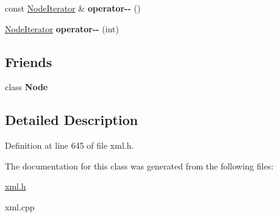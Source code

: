 \begin{DoxyCompactItemize}
\item 
\hypertarget{classphys_1_1xml_1_1NodeIterator_a9d0ace0a01c3ea0a0ff2ed389b4a5141}{
const \hyperlink{classphys_1_1xml_1_1NodeIterator}{NodeIterator} \& {\bfseries operator-\/-\/} ()}
\label{da/d4f/classphys_1_1xml_1_1NodeIterator_a9d0ace0a01c3ea0a0ff2ed389b4a5141}

\item 
\hypertarget{classphys_1_1xml_1_1NodeIterator_a4775254b1fbfc2e10a6024241be55f6a}{
\hyperlink{classphys_1_1xml_1_1NodeIterator}{NodeIterator} {\bfseries operator-\/-\/} (int)}
\label{da/d4f/classphys_1_1xml_1_1NodeIterator_a4775254b1fbfc2e10a6024241be55f6a}

\end{DoxyCompactItemize}
\subsection*{Friends}
\begin{DoxyCompactItemize}
\item 
\hypertarget{classphys_1_1xml_1_1NodeIterator_a6db9d28bd448a131448276ee03de1e6d}{
class {\bfseries Node}}
\label{da/d4f/classphys_1_1xml_1_1NodeIterator_a6db9d28bd448a131448276ee03de1e6d}

\end{DoxyCompactItemize}


\subsection{Detailed Description}


Definition at line 645 of file xml.h.



The documentation for this class was generated from the following files:\begin{DoxyCompactItemize}
\item 
\hyperlink{xml_8h}{xml.h}\item 
xml.cpp\end{DoxyCompactItemize}
